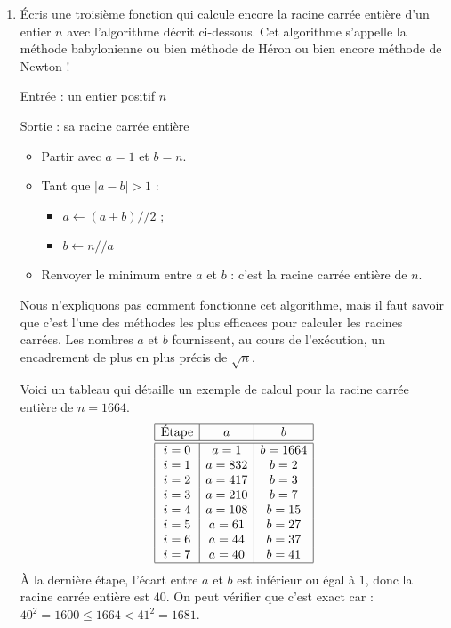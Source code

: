 \documentclass[11pt,class=report,crop=false]{standalone}
\begin{document}
\begin{activite}
\begin{enumerate}
  \item Écris une troisième fonction qui calcule encore la racine carrée entière d'un entier $n$ avec l'algorithme décrit ci-dessous. Cet algorithme s'appelle la méthode babylonienne ou bien méthode de Héron ou bien encore méthode de Newton !
  
    \begin{algorithme}
  Entrée : un entier positif $n$

  Sortie : sa racine carrée entière

  \begin{itemize}
    \item  Partir avec $a=1$ et $b=n$.
    
    \item  Tant que $|a-b| > 1$ :
    \begin{itemize} 
     \item $a \leftarrow (a+b)//2$ ;
     \item $b \leftarrow n // a$ 
    \end{itemize}          
         
    \item Renvoyer le minimum entre $a$ et $b$ : c'est la racine carrée entière de $n$.
  \end{itemize} 
           
 \end{algorithme}
 
 
  Nous n'expliquons pas comment fonctionne cet algorithme, mais il faut savoir que c'est l'une des méthodes les plus efficaces pour calculer les racines carrées. Les nombres $a$ et $b$ fournissent, au cours de l’exécution, un encadrement de plus en plus précis de $\sqrt{n}$. 
  
  Voici un tableau qui détaille un exemple de calcul pour la racine carrée entière de $n=1664$.
$$\begin{array}{|c|c|c|} 
\hline
\text{Étape} & a & b \\ \hline\hline
i = 0  &  a =  1    &  b =  1664 \\
i = 1  &  a =  832  &  b =  2 \\
i = 2  &  a =  417  &  b =  3 \\
i = 3  &  a =  210  &  b =  7 \\
i = 4  &  a =  108  &  b =  15 \\
i = 5  &  a =  61   &  b =  27 \\
i = 6  &  a =  44   &  b =  37 \\
i = 7  &  a =  40   &  b =  41 \\ \hline
\end{array}$$
À la dernière étape, l'écart entre $a$ et $b$ est inférieur ou égal à $1$, donc la racine carrée entière est $40$. On peut vérifier que c'est exact car : $40^2 = 1600 \le 1664 < 41^2 = 1681$.
    

\end{enumerate}
\end{activite}
\end{document}
